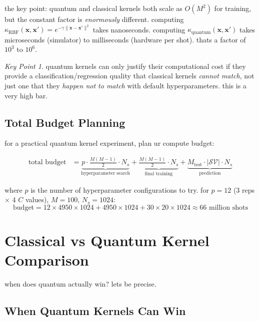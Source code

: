 \documentclass[11pt,a4paper]{article}
\theoremstyle{definition}
\theoremstyle{remark}
\newtheorem*{keypoint}{Key Point}
\begin{document}
the key point: quantum and classical kernels both scale as $O(M^2)$ for training, but the constant factor is \emph{enormously} different. computing $\kappa_{\text{RBF}}(\mathbf{x}, \mathbf{x}') = e^{-\gamma\|\mathbf{x} - \mathbf{x}'\|^2}$ takes nanoseconds. computing $\kappa_{\text{quantum}}(\mathbf{x}, \mathbf{x}')$ takes microseconds (simulator) to milliseconds (hardware per shot). thats a factor of $10^3$ to $10^6$.

\begin{keypoint}
quantum kernels can only justify their computational cost if they provide a classification/regression quality that classical kernels \emph{cannot match}, not just one that they \emph{happen not to match} with default hyperparameters. this is a very high bar.
\end{keypoint}

\subsection{Total Budget Planning}

for a practical quantum kernel experiment, plan ur compute budget:

\begin{align}
\text{total budget} &= \underbrace{p \cdot \frac{M(M-1)}{2} \cdot N_s}_{\text{hyperparameter search}} + \underbrace{\frac{M(M-1)}{2} \cdot N_s}_{\text{final training}} + \underbrace{M_{\text{test}} \cdot |\mathcal{SV}| \cdot N_s}_{\text{prediction}}
\end{align}

where $p$ is the number of hyperparameter configurations to try. for $p = 12$ (3 reps $\times$ 4 $C$ values), $M = 100$, $N_s = 1024$:
\[
\text{budget} = 12 \times 4950 \times 1024 + 4950 \times 1024 + 30 \times 20 \times 1024 \approx 66 \text{ million shots}
\]

\section{Classical vs Quantum Kernel Comparison}

when does quantum actually win? lets be precise.

\subsection{When Quantum Kernels Can Win}
\end{document}
